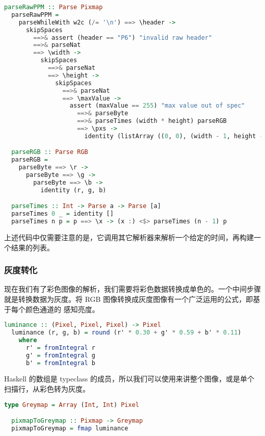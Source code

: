 \documentclass[./main.tex]{subfiles}
\begin{document}
\begin{lstlisting}[language=Haskell]
  parseRawPPM :: Parse Pixmap
  parseRawPPM =
    parseWhileWith w2c (/= '\n') ==> \header ->
      skipSpaces
        ==>& assert (header == "P6") "invalid raw header"
        ==>& parseNat
        ==> \width ->
          skipSpaces
            ==>& parseNat
            ==> \height ->
              skipSpaces
                ==>& parseNat
                ==> \maxValue ->
                  assert (maxValue == 255) "max value out of spec"
                    ==>& parseByte
                    ==>& parseTimes (width * height) parseRGB
                    ==> \pxs ->
                      identity (listArray ((0, 0), (width - 1, height - 1)) pxs)

  parseRGB :: Parse RGB
  parseRGB =
    parseByte ==> \r ->
      parseByte ==> \g ->
        parseByte ==> \b ->
          identity (r, g, b)

  parseTimes :: Int -> Parse a -> Parse [a]
  parseTimes 0 _ = identity []
  parseTimes n p = p ==> \x -> (x :) <$> parseTimes (n - 1) p
\end{lstlisting}

上述代码中仅需要注意的是，它调用其它解析器来解析一个给定的时间，再构建一个结果的列表。

\subsubsection*{灰度转化}

现在我们有了彩色图像的解析，我们需要将彩色数据转换成单色的。一个中间步骤就是转换数据为灰度。将 RGB 图像转换成灰度图像有一个广泛运用的公式，即基于每个颜色通道的
感知亮度。

\begin{lstlisting}[language=Haskell]
  luminance :: (Pixel, Pixel, Pixel) -> Pixel
  luminance (r, g, b) = round (r' * 0.30 + g' * 0.59 + b' * 0.11)
    where
      r' = fromIntegral r
      g' = fromIntegral g
      b' = fromIntegral b
\end{lstlisting}

Haskell 的数组是 typeclass 的成员，所以我们可以使用来讲整个图像，或是单个扫描行，从彩色转为灰度。

\begin{lstlisting}[language=Haskell]
  type Greymap = Array (Int, Int) Pixel

  pixmapToGreymap :: Pixmap -> Greymap
  pixmapToGreymap = fmap luminance
\end{lstlisting}
\end{document}

